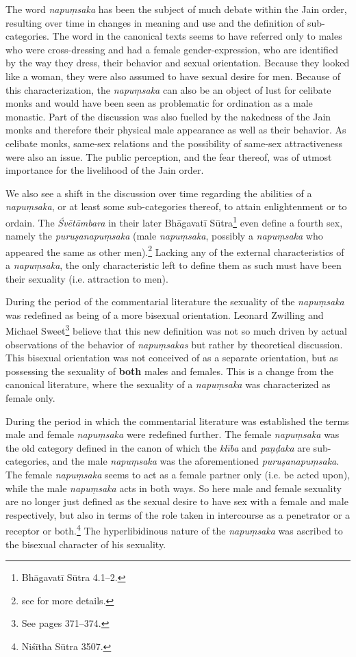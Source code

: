 The word {\em napuṃsaka} has been the subject of much debate within the Jain order, resulting over time in changes in meaning and use and the definition of sub-categories. The word in the canonical texts seems to have referred only to males who were cross-dressing and had a female gender-expression, who are identified by the way they dress, their behavior and sexual orientation. Because they looked like a woman, they were also assumed to have sexual desire for men. Because of this characterization, the {\em napuṃsaka} can also be an object of lust for celibate monks and would have been seen as problematic for ordination as a male monastic. Part of the discussion was also fuelled by the nakedness of the Jain monks and therefore their physical male appearance as well as their behavior. As celibate monks, same-sex relations and the possibility of same-sex attractiveness were also an issue. The public perception, and the fear thereof, was of utmost importance for the livelihood of the Jain order. 

We also see a shift in the discussion over time regarding the abilities of a {\em napuṃsaka}, or at least some sub-categories thereof, to attain enlightenment or to ordain. The {\em Śvētāmbara} in their later Bhāgavatī Sūtra\footnote{Bhāgavatī Sūtra 4.1–2.} even define a fourth sex, namely the {\em puruṣanapuṃsaka} (male {\em napuṃsaka}, possibly a {\em napuṃsaka} who appeared the same as other men).\footnote{see \cite{zwilling} for more details.} Lacking any of the external characteristics of a {\em napuṃsaka}, the only characteristic left to define them as such must have been their sexuality (i.e. attraction to men).

During the period of the commentarial literature the sexuality of the {\em napuṃsaka} was redefined as being of a more bisexual orientation. Leonard Zwilling and Michael Sweet\footnote{See \cite{zwilling} pages 371–374.} believe that this new definition was not so much driven by actual observations of the behavior of {\em napuṃsakas} but rather by theoretical discussion. This bisexual orientation was not conceived of as a separate orientation, but as possessing the sexuality of \textbf{both} males and females. This is a change from the canonical literature, where the sexuality of a {\em napuṃsaka} was characterized as female only.

During the period in which the commentarial literature was established the terms male and female {\em napuṃsaka} were redefined further. The female {\em napuṃsaka} was the old category defined in the canon of which the {\em klība} and {\em paṇḍaka} are sub-categories, and the male {\em napuṃsaka} was the aforementioned {\em puruṣanapuṃsaka}. The female {\em napuṃsaka} seems to act as a female partner only (i.e. be acted upon), while the male {\em napuṃsaka} acts in both ways. So here male and female sexuality are no longer just defined as the sexual desire to have sex with a female and male respectively, but also in terms of the role taken in intercourse as a penetrator or a receptor or both.\footnote{Niśītha Sūtra 3507.} The hyperlibidinous nature of the {\em napuṃsaka} was ascribed to the bisexual character of his sexuality.

